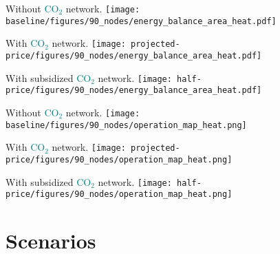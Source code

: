 \documentclass[12pt, aspectratio=169]{beamer}
\newcommand{\carbon}{\textcolor{teal}{CO$_2$}}
\begin{document}
\begin{frame}
    \begin{center}
    Without \carbon{} network.
    \texttt{[image: baseline/figures/90\_nodes/energy\_balance\_area\_heat.pdf]}
    \end{center}
\end{frame}

\begin{frame}
    \begin{center}
    With \carbon{} network.
    \texttt{[image: projected-price/figures/90\_nodes/energy\_balance\_area\_heat.pdf]}
    \end{center}
\end{frame}


\begin{frame}
    \begin{center}
    With subsidized \carbon{} network.
    \texttt{[image: half-price/figures/90\_nodes/energy\_balance\_area\_heat.pdf]}
    \end{center}
\end{frame}


\begin{frame}
    \begin{center}
    Without \carbon{} network.
    \texttt{[image: baseline/figures/90\_nodes/operation\_map\_heat.png]}
    \end{center}
\end{frame}



\begin{frame}
    \begin{center}
    With \carbon{} network.
    \texttt{[image: projected-price/figures/90\_nodes/operation\_map\_heat.png]}
    \end{center}
\end{frame}


\begin{frame}
    \begin{center}
    With subsidized \carbon{} network.
    \texttt{[image: half-price/figures/90\_nodes/operation\_map\_heat.png]}
    \end{center}
\end{frame}



\section{Scenarios}
\end{document}
